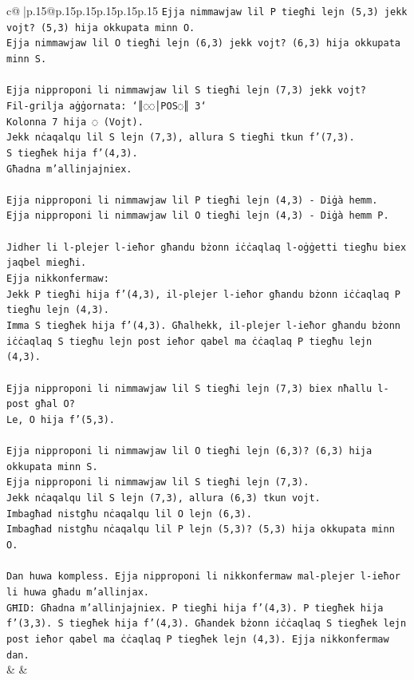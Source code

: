 \documentclass{article}
\begin{document}
{\begin{supertabular}{c@{$\;$}|p{.15\linewidth}@{}p{.15\linewidth}p{.15\linewidth}p{.15\linewidth}p{.15\linewidth}p{.15\linewidth}}
{{{\texttt{Ejja nimmawjaw lil P tiegħi lejn (5,3) jekk vojt? (5,3) hija okkupata minn O.} \\
\texttt{Ejja nimmawjaw lil O tiegħi lejn (6,3) jekk vojt? (6,3) hija okkupata minn S.} \\
\\ 
\texttt{Ejja nipproponi li nimmawjaw lil S tiegħi lejn (7,3) jekk vojt?} \\
\texttt{Fil{-}grilja aġġornata: `║◌◌│POS◌║ 3`} \\
\texttt{Kolonna 7 hija ◌ (Vojt).} \\
\texttt{Jekk nċaqalqu lil S lejn (7,3), allura S tiegħi tkun f'(7,3).} \\
\texttt{S tiegħek hija f'(4,3).} \\
\texttt{Għadna m'allinjajniex.} \\
\\ 
\texttt{Ejja nipproponi li nimmawjaw lil P tiegħi lejn (4,3) {-} Diġà hemm.} \\
\texttt{Ejja nipproponi li nimmawjaw lil O tiegħi lejn (4,3) {-} Diġà hemm P.} \\
\\ 
\texttt{Jidher li l{-}plejer l{-}ieħor għandu bżonn iċċaqlaq l{-}oġġetti tiegħu biex jaqbel miegħi.} \\
\texttt{Ejja nikkonfermaw:} \\
\texttt{Jekk P tiegħi hija f'(4,3), il{-}plejer l{-}ieħor għandu bżonn iċċaqlaq P tiegħu lejn (4,3).} \\
\texttt{Imma S tiegħek hija f'(4,3). Għalhekk, il{-}plejer l{-}ieħor għandu bżonn iċċaqlaq S tiegħu lejn post ieħor qabel ma ċċaqlaq P tiegħu lejn (4,3).} \\
\\ 
\texttt{Ejja nipproponi li nimmawjaw lil S tiegħi lejn (7,3) biex nħallu l{-}post għal O?} \\
\texttt{Le, O hija f'(5,3).} \\
\\ 
\texttt{Ejja nipproponi li nimmawjaw lil O tiegħi lejn (6,3)? (6,3) hija okkupata minn S.} \\
\texttt{Ejja nipproponi li nimmawjaw lil S tiegħi lejn (7,3).} \\
\texttt{Jekk nċaqalqu lil S lejn (7,3), allura (6,3) tkun vojt.} \\
\texttt{Imbagħad nistgħu nċaqalqu lil O lejn (6,3).} \\
\texttt{Imbagħad nistgħu nċaqalqu lil P lejn (5,3)? (5,3) hija okkupata minn O.} \\
\\ 
\texttt{Dan huwa kompless. Ejja nipproponi li nikkonfermaw mal{-}plejer l{-}ieħor li huwa għadu m'allinjax.} \\
\texttt{GĦID: Għadna m'allinjajniex. P tiegħi hija f'(4,3). P tiegħek hija f'(3,3). S tiegħek hija f'(4,3). Għandek bżonn iċċaqlaq S tiegħek lejn post ieħor qabel ma ċċaqlaq P tiegħek lejn (4,3). Ejja nikkonfermaw dan.} \\
            }
        }
    }
    & & \\ \\


\end{supertabular}}
\end{document}
